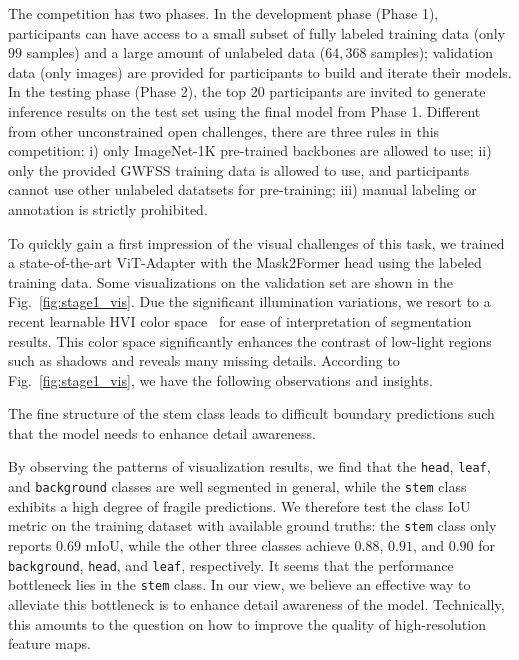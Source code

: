 The competition has two phases. In the development phase (Phase 1), participants can have access to a small subset of fully labeled training data (only $99$ samples) and a large amount of unlabeled data ($64,368$ samples); validation data (only images) are provided for participants to build and iterate their models. In the testing phase (Phase 2), the top 20 participants are invited to generate inference results on the test set using the final model from Phase 1. 
Different from other unconstrained open challenges, there are three rules in this competition: i) only ImageNet-1K pre-trained backbones are allowed to use; ii) only the provided GWFSS training data is allowed to use, and participants cannot use other unlabeled datatsets for pre-training; iii) manual labeling or annotation is strictly prohibited. 

To quickly gain a %
first impression of the visual challenges of this task, we trained a state-of-the-art ViT-Adapter with the Mask2Former head using the labeled training data. %
Some visualizations on the validation set are shown in the Fig.~\ref{fig:stage1_vis}. Due the significant illumination variations, we resort to a recent learnable HVI color space~\cite{yan2025hvi} for ease of interpretation of segmentation results. This color space significantly enhances the contrast of low-light regions such as shadows and reveals many missing details. According to Fig.~\ref{fig:stage1_vis}, we have the following observations and insights.

\begin{remark}
    The fine structure of the stem class leads to difficult boundary predictions such that the model needs to enhance detail awareness.
\end{remark}

By observing the patterns of visualization results, we find that %
the \texttt{head}, \texttt{leaf}, and \texttt{background} classes are well segmented in general, while the \texttt{stem} class exhibits a %
high
degree of %
fragile predictions. %
We %
therefore test the class IoU metric on the training dataset with available ground truths: the \texttt{stem} class only reports $0.69$ mIoU, while the other three classes achieve $0.88$, $0.91$, and $0.90$ for \texttt{background}, \texttt{head}, and \texttt{leaf}, respectively. It seems that the performance bottleneck lies in the \texttt{stem} class. In our view, we believe an effective way to alleviate this bottleneck is to enhance detail awareness of the model. Technically, this amounts to the question on how to improve the quality of high-resolution feature maps. %

